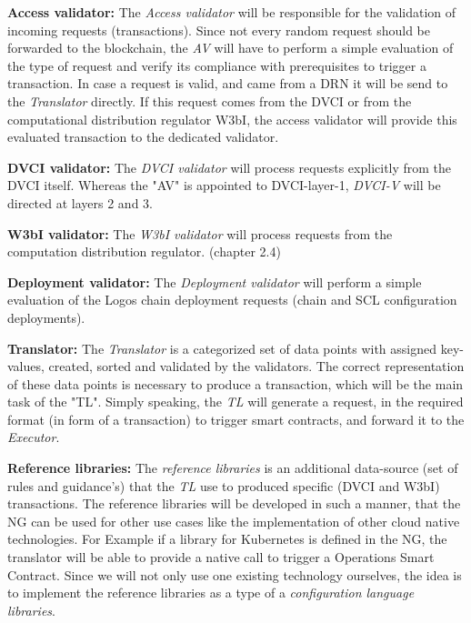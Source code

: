 \documentclass[]{article}
\begin{document}
\textbf{Access validator:}
The \textit{Access validator} will be responsible for the validation of incoming requests (transactions). 
Since not every random request should be forwarded to the blockchain, the \textit{AV} will have to perform a simple evaluation of the type of request and verify its compliance with prerequisites to trigger a transaction. 
In case a request is valid, and came from a DRN it will be send to the \textit{Translator} directly.
If this request comes from the DVCI or from the computational distribution regulator W3bI, the access validator will provide this evaluated transaction to the dedicated validator.
\newline

\textbf{DVCI validator:}
The \textit{DVCI validator} will process requests explicitly from the DVCI itself.
Whereas the "AV" is appointed to DVCI-layer-1, \textit{DVCI-V} will be directed at layers 2 and 3.    
\newline

\textbf{W3bI validator:}
The \textit{W3bI validator} will process requests from the computation distribution regulator. (chapter 2.4) 
\newline

\textbf{Deployment validator:}
The \textit{Deployment validator} will perform a simple evaluation of the Logos chain deployment requests (chain and SCL configuration deployments).     
\newline

\textbf{Translator:}
The \textit{Translator} is a categorized set of data points with assigned key-values, created, sorted and validated by the validators. 
The correct representation of these data points is necessary to produce a transaction, which will be the main task of the "TL". 
Simply speaking, the \textit{TL} will generate a request, in the required format (in form of a transaction) to trigger smart contracts, and forward it to the \textit{Executor}.   
\newline

\textbf{Reference libraries:}
The \textit{reference libraries} is an additional data-source (set of rules and guidance's) that the \textit{TL} use to produced specific (DVCI and W3bI) transactions.
The reference libraries will be developed in such a manner, that the NG can be used for other use cases like the implementation of other cloud native technologies.
For Example if a library for Kubernetes is defined in the NG, the translator will be able to provide a native call to trigger a Operations Smart Contract.
Since we will not only use one existing technology ourselves, the idea is to implement the reference libraries as a type of a \textit{configuration language libraries}.
\newline
\end{document}
